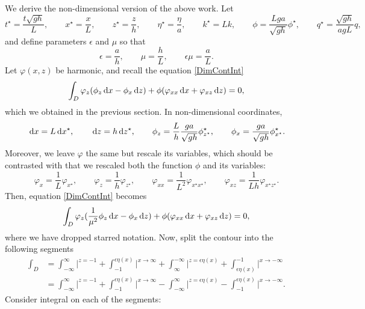 \documentclass[10pt,reqno,oneside,a4paper]{article}
\begin{document}
We derive the non-dimensional version of the above work. Let 
\begin{equation}\label{NDcoord}
t^{\star} = \frac{t \sqrt{gh}}{L}, \qquad x^{\star}  = \frac{x}{L}, \qquad z^{\star}  = \frac{z}{h}, \qquad \eta^{\star}  = \frac{\eta}{a}, \qquad k^{\star}  = Lk, \qquad \phi = \frac{Lga}{\sqrt{gh}} \phi^{\star}, \qquad q^{\star}  = \frac{\sqrt{gh}}{agL} q,
\end{equation}
and define parameters $\epsilon$ and $\mu$ so that
\[ 
\epsilon = \frac{a}{h}, \qquad \mu = \frac{h}{L}, \qquad \epsilon \mu = \frac{a}{L}.
\] 
Let $\varphi(x,z)$ be harmonic, and recall the equation \eqref{DimContInt}
\begin{equation*}
\int_D \varphi_z(\phi_z \,\mathrm{d} x - \phi_x \,\mathrm{d} z) + \phi(\varphi_{xx} \,\mathrm{d} x + \varphi_{xz} \,\mathrm{d} z) = 0,
\end{equation*}
which we obtained in the previous section.
In non-dimensional coordinates,
\[ 
\,\mathrm{d} x = L \,\mathrm{d} x^{\star}, \qquad \,\mathrm{d} z = h \,\mathrm{d} z^{\star}, \qquad \phi_z = \frac{L}{h}\frac{ga}{\sqrt{gh}} \phi^{\star}_{z^{\star}}, \qquad \phi_x = \frac{ga}{\sqrt{gh}} \phi^{\star}_{x^{\star}}.
\]
Moreover, we leave $\varphi$ the same but rescale its variables, which should be contrasted with that we rescaled both the function $\phi$ and its variables:
\[ 
\varphi_x = \frac{1}{L} \varphi_{x^{\star}}, \qquad \varphi_z = \frac{1}{h} \varphi_{z^{\star}}, \qquad \varphi_{xx} = \frac{1}{L^2} \varphi_{x^{\star}x^{\star}}, \qquad \varphi_{xz} = \frac{1}{Lh} \varphi_{x^{\star}z^{\star}}.
\]
Then, equation \eqref{DimContInt} becomes 
\begin{equation}\label{NDimContIn}
\int_D \varphi_z(\frac{1}{\mu^2}\phi_z \,\mathrm{d} x - \phi_x \,\mathrm{d} z) + \phi(\varphi_{xx} \,\mathrm{d} x + \varphi_{xz} \,\mathrm{d} z) = 0,
\end{equation}
where we have dropped starred notation. Now, split the contour into the following segments
\begin{align*}
\int_D &= \int_{-\infty}^{\infty} \bigg|^{z = -1} + \int_{-1}^{\epsilon\eta(x)} \bigg|^{x  \to \infty} + \int^{-\infty}_{\infty} \bigg|^{z = \epsilon\eta(x)} + \int_{\epsilon\eta(x)}^{-1} \bigg|^{x \to -\infty} \\
&= \int_{-\infty}^{\infty} \bigg|^{z = -1} + \int_{-1}^{\epsilon\eta(x)} \bigg|^{x  \to \infty} - \int^{\infty}_{-\infty} \bigg|^{z = \epsilon\eta(x)} - \int^{\epsilon\eta(x)}_{-1} \bigg|^{x \to -\infty}.
\end{align*}
Consider integral on each of the segments:
\end{document}
